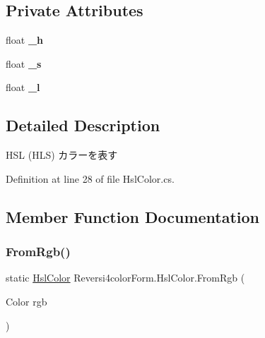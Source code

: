 \subsection*{Private Attributes}
\begin{DoxyCompactItemize}
\item 
\mbox{\label{class_reversi4color_form_1_1_hsl_color_af797949118aa18d14454f6c1d24e520b}} 
float {\bfseries \+\_\+h}
\item 
\mbox{\label{class_reversi4color_form_1_1_hsl_color_aac58e42c373ceb364180296ec5de9ef9}} 
float {\bfseries \+\_\+s}
\item 
\mbox{\label{class_reversi4color_form_1_1_hsl_color_aa4b98c49cacfb53aa337c72536a7d775}} 
float {\bfseries \+\_\+l}
\end{DoxyCompactItemize}


\subsection{Detailed Description}
H\+SL (H\+LS) カラーを表す 

Definition at line 28 of file Hsl\+Color.\+cs.



\subsection{Member Function Documentation}
\mbox{\label{class_reversi4color_form_1_1_hsl_color_ae9adbbe822f39c29ef11839c80923718}} 
\subsubsection{\texorpdfstring{From\+Rgb()}{FromRgb()}}
{\footnotesize\ttfamily static \hyperlink{class_reversi4color_form_1_1_hsl_color}{Hsl\+Color} Reversi4color\+Form.\+Hsl\+Color.\+From\+Rgb (\begin{DoxyParamCaption}\item[{Color}]{rgb }\end{DoxyParamCaption})\hspace{0.3cm}{\ttfamily [static]}}



